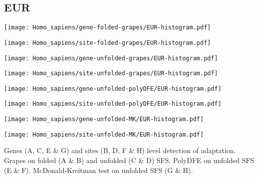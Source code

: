 \documentclass{article}
\begin{document}
\pagebreak
\subsection{EUR}
\centering
\begin{minipage}{0.49\linewidth}
    \texttt{[image: Homo\_sapiens/gene-folded-grapes/EUR-histogram.pdf]}
\end{minipage}%
\hfill
\begin{minipage}{0.49\linewidth}
    \texttt{[image: Homo\_sapiens/site-folded-grapes/EUR-histogram.pdf]}
\end{minipage}
\hfill
\begin{minipage}{0.49\linewidth}
    \texttt{[image: Homo\_sapiens/gene-unfolded-grapes/EUR-histogram.pdf]}
\end{minipage}%
\hfill
\begin{minipage}{0.49\linewidth}
    \texttt{[image: Homo\_sapiens/site-unfolded-grapes/EUR-histogram.pdf]}
\end{minipage}
\hfill
\begin{minipage}{0.49\linewidth}
    \texttt{[image: Homo\_sapiens/gene-unfolded-polyDFE/EUR-histogram.pdf]}
\end{minipage}%
\hfill
\begin{minipage}{0.49\linewidth}
    \texttt{[image: Homo\_sapiens/site-unfolded-polyDFE/EUR-histogram.pdf]}
\end{minipage}
\hfill
\begin{minipage}{0.49\linewidth}
    \texttt{[image: Homo\_sapiens/gene-unfolded-MK/EUR-histogram.pdf]}
\end{minipage}%
\hfill
\begin{minipage}{0.49\linewidth}
    \texttt{[image: Homo\_sapiens/site-unfolded-MK/EUR-histogram.pdf]}
\end{minipage}
\hfill
\flushleft
Genes (A, C, E \& G) and sites (B, D, F \& H) level detection of adaptation.
Grapes on folded (A \& B) and unfolded (C \& D) SFS.
PolyDFE on unfolded SFS (E \& F).
McDonald-Kreitman test on unfolded SFS (G \& H).
\end{document}
